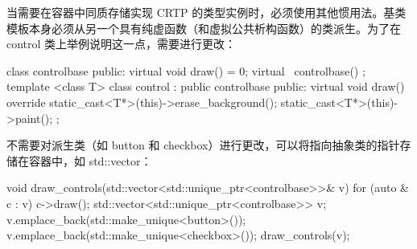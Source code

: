 
当需要在容器中同质存储实现 CRTP 的类型实例时，必须使用其他惯用法。基类模板本身必须从另一个具有纯虚函数（和虚拟公共析构函数）的类派生。为了在 control 类上举例说明这一点，需要进行更改：

\begin{cpp}
class controlbase
{
public:
    virtual void draw() = 0;
    virtual ~controlbase() {}
};
template <class T>
class control : public controlbase
{
public:
    virtual void draw() override
    {
        static_cast<T*>(this)->erase_background();
        static_cast<T*>(this)->paint();
    }
};
\end{cpp}

不需要对派生类（如 button 和 checkbox）进行更改，可以将指向抽象类的指针存储在容器中，如 std::vector：

\begin{cpp}
void draw_controls(std::vector<std::unique_ptr<controlbase>>& v)
{
    for (auto & c : v)
    {
        c->draw();
    }
}
std::vector<std::unique_ptr<controlbase>> v;
v.emplace_back(std::make_unique<button>());
v.emplace_back(std::make_unique<checkbox>());
draw_controls(v);
\end{cpp}


